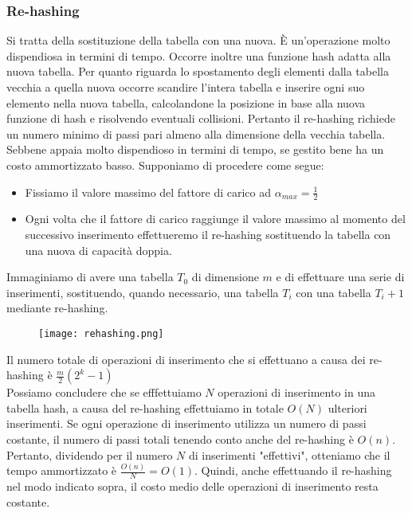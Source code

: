 \subsubsection{Re-hashing}
Si tratta della sostituzione della tabella con una nuova.
È un'operazione molto dispendiosa in termini di tempo. Occorre inoltre una funzione hash adatta alla nuova tabella.
Per quanto riguarda lo spostamento degli elementi dalla tabella vecchia a quella nuova occorre scandire l'intera tabella
e inserire ogni suo elemento nella nuova tabella,
calcolandone la posizione in base alla nuova funzione di hash e risolvendo eventuali collisioni.
Pertanto il re-hashing richiede un numero minimo di passi pari almeno alla dimensione della vecchia tabella.
Sebbene appaia molto dispendioso in termini di tempo, se gestito bene ha un costo 
ammortizzato basso. Supponiamo di procedere come segue:
\begin{itemize}
    \item Fissiamo il valore massimo del fattore di carico ad $\alpha_{max} = \frac{1}{2}$
    \item Ogni volta che il fattore di carico raggiunge il valore massimo al 
    momento del successivo inserimento effettueremo il re-hashing sostituendo la tabella con una nuova 
    di capacità doppia.
\end{itemize}
Immaginiamo di avere una tabella $T_0$ di dimensione $m$ e di effettuare una serie 
di inserimenti, sostituendo, quando necessario, una tabella $T_i$ con una tabella $T_i+1$ mediante re-hashing.
\begin{figure}[h]
    \texttt{[image: rehashing.png]}
\end{figure}
Il numero totale di operazioni di inserimento che si effettuano a causa dei re-hashing è
$\frac{m}{2}(2^{k} - 1)$\\
Possiamo concludere che se efffettuiamo $N$ operazioni di inserimento in una 
tabella hash, a causa del re-hashing effettuiamo in totale $O(N)$ ulteriori inserimenti.
Se ogni operazione di inserimento utilizza un numero di passi costante, il numero di passi totali tenendo conto anche 
del re-hashing è $O(n)$. Pertanto, dividendo per il numero $N$ di inserimenti "effettivi", otteniamo
che il tempo ammortizzato è $\frac{O(n)}{N} = O(1)$. Quindi, anche effettuando il re-hashing 
nel modo indicato sopra, il costo medio delle operazioni di inserimento resta costante.
\clearpage